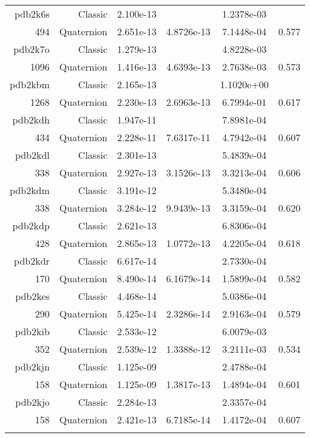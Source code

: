 \begin{xltabular}{\textwidth}{r|rS[table-format=1.3e+2]S[table-format=1.4e+2]S[table-format=1.4e+2]S[table-format=-1.3]}
pdb2k6s & Classic & 2.100e-13 &  & 1.2378e-03 & \\
494 & Quaternion & 2.651e-13 & 4.8726e-13 & 7.1448e-04 & 0.577\\  \addlinespace
{\color{red} pdb2k7o } & Classic & 1.279e-13 &  & 4.8228e-03 & \\
1096 & Quaternion & 1.416e-13 & 4.6393e-13 & 2.7638e-03 & 0.573\\  \addlinespace
{\color{red} pdb2kbm } & Classic & 2.165e-13 &  & 1.1020e+00 & \\
1268 & Quaternion & 2.230e-13 & 2.6963e-13 & 6.7994e-01 & 0.617\\  \addlinespace
pdb2kdh & Classic & 1.947e-11 &  & 7.8981e-04 & \\
434 & Quaternion & 2.228e-11 & 7.6317e-11 & 4.7942e-04 & 0.607\\  \addlinespace
pdb2kdl & Classic & 2.301e-13 &  & 5.4839e-04 & \\
338 & Quaternion & 2.927e-13 & 3.1526e-13 & 3.3213e-04 & 0.606\\  \addlinespace
pdb2kdm & Classic & 3.191e-12 &  & 5.3480e-04 & \\
338 & Quaternion & 3.284e-12 & 9.9439e-13 & 3.3159e-04 & 0.620\\  \addlinespace
pdb2kdp & Classic & 2.621e-13 &  & 6.8306e-04 & \\
428 & Quaternion & 2.865e-13 & 1.0772e-13 & 4.2205e-04 & 0.618\\  \addlinespace
pdb2kdr & Classic & 6.617e-14 &  & 2.7330e-04 & \\
170 & Quaternion & 8.490e-14 & 6.1679e-14 & 1.5899e-04 & 0.582\\  \addlinespace
pdb2kes & Classic & 4.468e-14 &  & 5.0386e-04 & \\
290 & Quaternion & 5.425e-14 & 2.3286e-14 & 2.9163e-04 & 0.579\\  \addlinespace
{\color{red} pdb2kib } & Classic & 2.533e-12 &  & 6.0079e-03 & \\
352 & Quaternion & 2.539e-12 & 1.3388e-12 & 3.2111e-03 & 0.534\\  \addlinespace
pdb2kjn & Classic & 1.125e-09 &  & 2.4788e-04 & \\
158 & Quaternion & 1.125e-09 & 1.3817e-13 & 1.4894e-04 & 0.601\\  \addlinespace
pdb2kjo & Classic & 2.284e-13 &  & 2.3357e-04 & \\
158 & Quaternion & 2.421e-13 & 6.7185e-14 & 1.4172e-04 & 0.607\\  \addlinespace

\end{xltabular}
